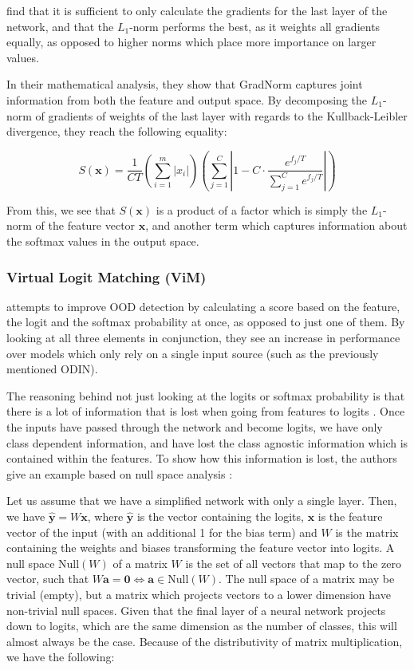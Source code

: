 \documentclass[conference,onecolumn]{IEEEtran}
\begin{document}
\cite{gradnorm} find that it is sufficient to only calculate the gradients for the last layer of the network, and that the $L_1$-norm performs the best, as it weights all gradients equally, as opposed to higher norms which place more importance on larger values.

In their mathematical analysis, they show that GradNorm captures joint information from both the feature and output space. By decomposing the $L_1$-norm of gradients of weights of the last layer with regards to the Kullback-Leibler divergence, they reach the following equality:

\begin{equation}
S(\bm{x}) = \frac{1}{CT}  \left(\sum_{i=1}^m |x_i|\right) \left(\sum_{j=1}^C \left|1 - C \cdot \frac{e^{f_j / T}}{\sum_{j=1}^C e^{{f_{j}} / T}}\right|\right)
\label{eq:decomp}
\end{equation}

From this, we see that $S(\bm{x})$ is a product of a factor which is simply the $L_1$-norm of the feature vector $\bm{x}$, and another term which captures information about the softmax values in the output space.
\\

\subsubsection{Virtual Logit Matching (ViM)}

\cite{vim} attempts to improve OOD detection by calculating a score based on the feature, the logit and the softmax probability at once, as opposed to just one of them. By looking at all three elements in conjunction, they see an increase in performance over models which only rely on a single input source (such as the previously mentioned ODIN).

The reasoning behind not just looking at the logits or softmax probability is that there is a lot of information that is lost when going from features to logits \cite{vim}. Once the inputs have passed through the network and become logits, we have only class dependent information, and have lost the class agnostic information which is contained within the features. To show how this information is lost, the authors give an example based on null space analysis \cite{nusa}:

Let us assume that we have a simplified network with only a single layer. Then, we have $\hat{\bm{y}} = W \bm{x}$, where $\hat{\bm{y}}$ is the vector containing the logits, $\bm{x}$ is the feature vector of the input (with an additional 1 for the bias term) and $W$ is the matrix containing the weights and biases transforming the feature vector into logits. A null space $\text{Null}(W)$ of a matrix $W$ is the set of all vectors that map to the zero vector, such that $W \bm{a} = \bm{0} \iff \bm{a} \in \text{Null}(W)$. The null space of a matrix may be trivial (empty), but a matrix which projects vectors to a lower dimension have non-trivial null spaces. Given that the final layer of a neural network projects down to logits, which are the same dimension as the number of classes, this will almost always be the case. Because of the distributivity of matrix multiplication, we have the following:
\end{document}
